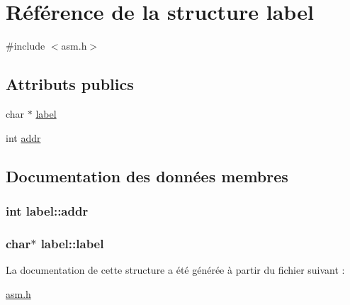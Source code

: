 \hypertarget{structlabel}{}\section{Référence de la structure label}
\label{structlabel}


{\ttfamily \#include $<$asm.\+h$>$}

\subsection*{Attributs publics}
\begin{DoxyCompactItemize}
\item 
char $\ast$ \hyperlink{structlabel_a23bae4982501f1331a7e61c2b22ed4f3}{label}
\item 
int \hyperlink{structlabel_af670c52b4f6b3aeaadc0ec95334e6e52}{addr}
\end{DoxyCompactItemize}


\subsection{Documentation des données membres}
\subsubsection[{\texorpdfstring{addr}{addr}}]{\setlength{\rightskip}{0pt plus 5cm}int label\+::addr}\hypertarget{structlabel_af670c52b4f6b3aeaadc0ec95334e6e52}{}\label{structlabel_af670c52b4f6b3aeaadc0ec95334e6e52}
\subsubsection[{\texorpdfstring{label}{label}}]{\setlength{\rightskip}{0pt plus 5cm}char$\ast$ label\+::label}\hypertarget{structlabel_a23bae4982501f1331a7e61c2b22ed4f3}{}\label{structlabel_a23bae4982501f1331a7e61c2b22ed4f3}


La documentation de cette structure a été générée à partir du fichier suivant \+:\begin{DoxyCompactItemize}
\item 
\hyperlink{asm_8h}{asm.\+h}\end{DoxyCompactItemize}

